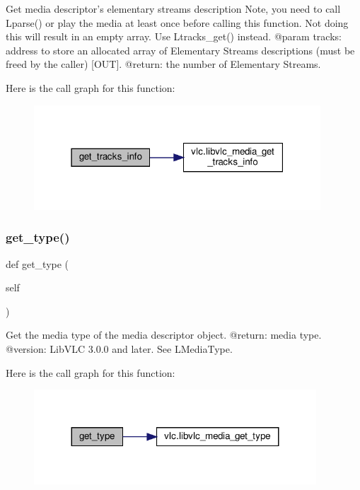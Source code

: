 \begin{DoxyVerb}Get media descriptor's elementary streams description
Note, you need to call L{parse}() or play the media at least once
before calling this function.
Not doing this will result in an empty array.
\deprecated Use L{tracks_get}() instead.
@param tracks: address to store an allocated array of Elementary Streams descriptions (must be freed by the caller) [OUT].
@return: the number of Elementary Streams.
\end{DoxyVerb}
 Here is the call graph for this function\+:
\nopagebreak
\begin{figure}[H]
\begin{center}
\leavevmode
\includegraphics[width=304pt]{classvlc_1_1_media_ade0a1ca6f083233d0027e4b9fdb68d8a_cgraph}
\end{center}
\end{figure}
\mbox{\label{classvlc_1_1_media_a1001d7b7b0e48724593b0a4334ca1b4e}} 
\subsubsection{\texorpdfstring{get\+\_\+type()}{get\_type()}}
{\footnotesize\ttfamily def get\+\_\+type (\begin{DoxyParamCaption}\item[{}]{self }\end{DoxyParamCaption})}

\begin{DoxyVerb}Get the media type of the media descriptor object.
@return: media type.
@version: LibVLC 3.0.0 and later. See L{MediaType}.
\end{DoxyVerb}
 Here is the call graph for this function\+:
\nopagebreak
\begin{figure}[H]
\begin{center}
\leavevmode
\includegraphics[width=299pt]{classvlc_1_1_media_a1001d7b7b0e48724593b0a4334ca1b4e_cgraph}
\end{center}
\end{figure}
\mbox{\label{classvlc_1_1_media_a46e189dfe465a3463ea9a0fba87bf237}} 

